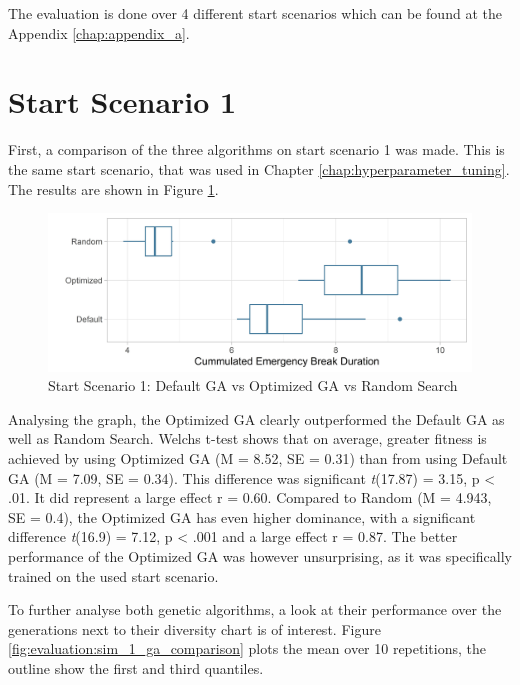The evaluation is done over 4 different start scenarios which can be found at the Appendix \ref{chap:appendix_a}.

\section{Start Scenario 1}
First, a comparison of the three algorithms on start scenario 1 was made. This is the same start scenario, that was used in Chapter \ref{chap:hyperparameter_tuning}. The results are shown in Figure \ref{fig:evaluation:sim_1_comparison}.

\begin{figure}[ht] 
	\label{fig:evaluation:sim_1_comparison}
	\includegraphics[width=1\linewidth]{simulations/evaluation/plots/sim_1_comparison}
	\caption{Start Scenario 1: Default GA vs Optimized GA vs Random Search}
\end{figure}

Analysing the graph, the Optimized GA clearly outperformed the Default GA as well as Random Search. Welchs t-test shows that on average, greater fitness is achieved by using Optimized GA (M = 8.52, SE = 0.31) than from using Default GA (M = 7.09, SE = 0.34). This difference was significant \textit{t}(17.87) = 3.15, p < .01. It did represent a large effect r = 0.60.
Compared to Random (M = 4.943, SE = 0.4), the Optimized GA has even higher dominance, with a significant difference \textit{t}(16.9) = 7.12, p < .001 and a large effect r = 0.87. The better performance of the Optimized GA was however unsurprising, as it was specifically trained on the used start scenario.

To further analyse both genetic algorithms, a look at their performance over the generations next to their diversity chart is of interest. Figure \ref{fig:evaluation:sim_1_ga_comparison} plots the mean over 10 repetitions, the outline show the first and third quantiles.

